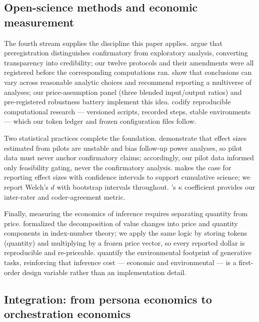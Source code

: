 \documentclass[12pt,a4paper]{article}
\begin{document}
\subsection{Open-science methods and economic measurement}

The fourth stream supplies the discipline this paper applies. \citet{NosekEtAl2018}
argue that preregistration distinguishes confirmatory from exploratory
analysis, converting transparency into credibility; our twelve protocols and their
amendments were all registered before the corresponding computations ran.
\citet{SteegenEtAl2016} show that conclusions can vary across reasonable
analytic choices and recommend reporting a multiverse of analyses; our
price-assumption panel (three blended input/output ratios) and pre-registered
robustness battery implement this idea. \citet{SandveEtAl2013} codify
reproducible computational research --- versioned scripts, recorded steps,
stable environments --- which our token ledger and frozen configuration files
follow.

Two statistical practices complete the foundation. \citet{AlbersLakens2018}
demonstrate that effect sizes estimated from pilots are unstable and bias
follow-up power analyses, so pilot data must never anchor confirmatory claims;
accordingly, our pilot data informed only feasibility gating, never the
confirmatory analysis. \citet{Lakens2013} makes the case for reporting effect sizes with
confidence intervals to support cumulative science; we report Welch's $d$ with
bootstrap intervals throughout. \citet{Cohen1960}'s $\kappa$ coefficient
provides our inter-rater and coder-agreement metric.

Finally, measuring the economics of inference requires separating quantity from
price. \citet{Diewert1976} formalized the decomposition of value changes into
price and quantity components in index-number theory; we apply the same logic
by storing tokens (quantity) and multiplying by a frozen price vector, so every
reported dollar is reproducible and re-priceable. \citet{TomlinsonEtAl2024}
quantify the environmental footprint of generative tasks, reinforcing that
inference cost --- economic and environmental --- is a first-order design
variable rather than an implementation detail.

\subsection{Integration: from persona economics to orchestration economics}
\end{document}
